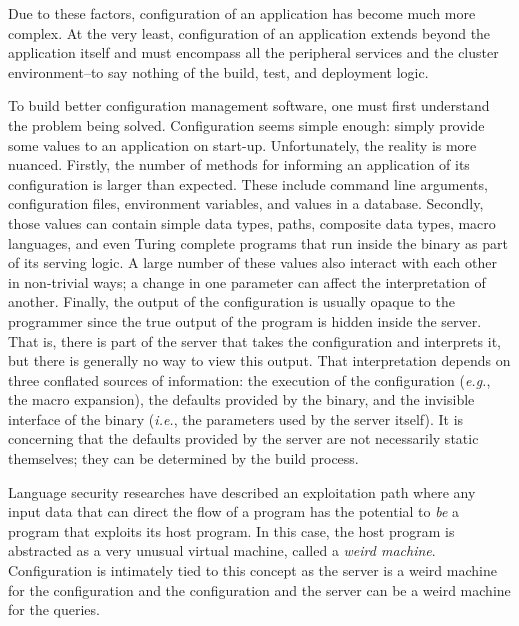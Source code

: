 \documentclass[letterpaper,twocolumn,10pt]{article}
\begin{document}
Due to these factors, configuration of an application has become much more complex. At the very least, configuration of an application extends beyond the application itself and must encompass all the peripheral services and the cluster environment--to say nothing of the build, test, and deployment logic.

To build better configuration management software, one must first understand the problem being solved. Configuration seems simple enough: simply provide some values to an application on start-up. Unfortunately, the reality is more nuanced. Firstly, the number of methods for informing an application of its configuration is larger than expected. These include command line arguments, configuration files, environment variables, and values in a database. Secondly, those values can contain simple data types, paths, composite data types, macro languages, and even Turing complete programs that run inside the binary as part of its serving logic. A large number of these values also interact with each other in non-trivial ways; a change in one parameter can affect the interpretation of another. Finally, the output of the configuration is usually opaque to the programmer since the true output of the program is hidden inside the server. That is, there is part of the server that takes the configuration and interprets it, but there is generally no way to view this output. That interpretation depends on three conflated sources of information: the execution of the configuration (\emph{e.g.}, the macro expansion), the defaults provided by the binary, and the invisible interface of the binary (\emph{i.e.}, the parameters used by the server itself). It is concerning that the defaults provided by the server are not necessarily static themselves; they can be determined by the build process.

Language security researches have described an exploitation path where any input data that can direct the flow of a program has the potential to \emph{be} a program that exploits its host program. In this case, the host program is abstracted as a very unusual virtual machine, called a \emph{weird machine}. Configuration is intimately tied to this concept as the server is a weird machine for the configuration and the configuration and the server can be a weird machine for the queries.
\end{document}
